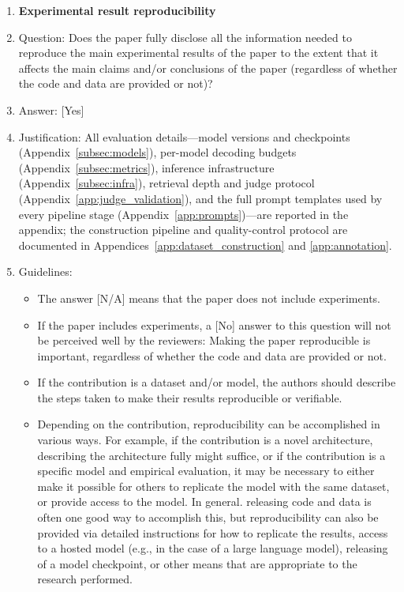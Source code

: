 \documentclass{llmxive}
\providecommand{\answerYes}[1][]{[Yes]#1}
\providecommand{\answerNo}[1][]{[No]#1}
\providecommand{\answerNA}[1][]{[N/A]#1}
\begin{document}
\begin{enumerate}
    \item {\bf Experimental result reproducibility}
    \item[] Question: Does the paper fully disclose all the information needed to reproduce the main experimental results of the paper to the extent that it affects the main claims and/or conclusions of the paper (regardless of whether the code and data are provided or not)?
    \item[] Answer: \answerYes{}
    \item[] Justification: All evaluation details---model versions and checkpoints (Appendix~\ref{subsec:models}), per-model decoding budgets (Appendix~\ref{subsec:metrics}), inference infrastructure (Appendix~\ref{subsec:infra}), retrieval depth and judge protocol (Appendix~\ref{app:judge_validation}), and the full prompt templates used by every pipeline stage (Appendix~\ref{app:prompts})---are reported in the appendix; the construction pipeline and quality-control protocol are documented in Appendices~\ref{app:dataset_construction} and \ref{app:annotation}.
    \item[] Guidelines:
    \begin{itemize}
        \item The answer \answerNA{} means that the paper does not include experiments.
        \item If the paper includes experiments, a \answerNo{} answer to this question will not be perceived well by the reviewers: Making the paper reproducible is important, regardless of whether the code and data are provided or not.
        \item If the contribution is a dataset and\slash or model, the authors should describe the steps taken to make their results reproducible or verifiable.
        \item Depending on the contribution, reproducibility can be accomplished in various ways. For example, if the contribution is a novel architecture, describing the architecture fully might suffice, or if the contribution is a specific model and empirical evaluation, it may be necessary to either make it possible for others to replicate the model with the same dataset, or provide access to the model. In general. releasing code and data is often one good way to accomplish this, but reproducibility can also be provided via detailed instructions for how to replicate the results, access to a hosted model (e.g., in the case of a large language model), releasing of a model checkpoint, or other means that are appropriate to the research performed.

\end{itemize}
\end{enumerate}
\end{document}
